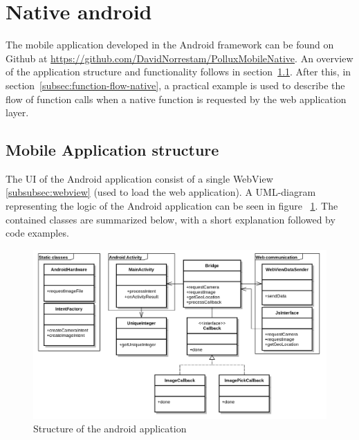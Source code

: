 \section{Native android} \label{sec:native-android}
The mobile application developed in the Android framework can be found on Github at \url{https://github.com/DavidNorrestam/PolluxMobileNative}. An overview of the application structure and functionality follows in section~\ref{subsec:mobile-application-structure-native}. After this, in section~\ref{subsec:function-flow-native}, a practical example is used to describe the flow of function calls when a native function is requested by the web application layer.


\subsection{Mobile Application structure} \label{subsec:mobile-application-structure-native}
The UI of the Android application consist of a single WebView \ref{subsubsec:webview} (used to load the web application). A UML-diagram representing the logic of the Android application can be seen in figure ~\ref{fig:nativeuml}. The contained classes are summarized below, with a short explanation followed by code examples.

\begin{figure}
	\centering
    \includegraphics[width=150mm,natwidth=1000,natheight=750]{./img/polluxuml.png}
    \caption{Structure of the android application}
    \label{fig:nativeuml}
\end{figure}

